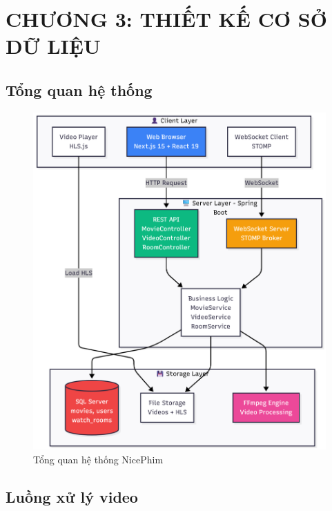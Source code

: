 \newpage
\section{\textbf{ CHƯƠNG 3: THIẾT KẾ CƠ SỞ DỮ LIỆU}}

\subsection{Tổng quan hệ thống}

\begin{figure}[H]
	\centering
	\includegraphics[width=1\textwidth]{image/mermaid/tongquahethong.png}
	\caption{Tổng quan hệ thống NicePhim}
	\label{fig:tongquahethong}
\end{figure}

\subsection{Luồng xử lý video}

